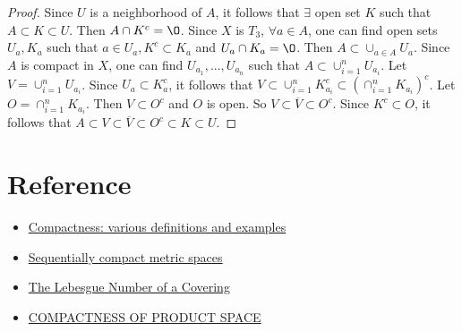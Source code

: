 \begin{proof}
    Since $U$ is a neighborhood of $A$, it follows that $\exists$ open set $K$ such that $A\subset K\subset U$. 
    Then $A\cap K^c=\O$. Since $X$ is $T_3$, $\forall a\in A$, 
    one can find open sets $U_a,K_a$ such that $a\in U_a, K^c\subset K_a$ and $U_a\cap K_a=\O$. 
    Then $A\subset \cup_{a\in A}U_a$. Since $A$ is compact in $X$, one can find $U_{a_1},...,U_{a_n}$ such that $A\subset \cup_{i=1}^{n} U_{a_i}$.
    Let $V=\cup_{i=1}^{n}U_{a_i}$. 
    Since $U_{a}\subset K_a^c$, it follows that $V\subset \cup_{i=1}^{n} K_{a_i}^c\subset (\cap_{i=1}^{n} K_{a_i})^c$.
    Let $O=\cap_{i=1}^{n} K_{a_i}$. Then $V\subset O^c$ and $O$ is open. So $V\subset \overline{V}\subset O^c$.
    Since $K^c\subset O$, it follows that $A\subset V\subset \overline{V}\subset O^c\subset K\subset U$.
\end{proof}



\section{Reference}

\begin{itemize}
    \item \href{http://staff.ustc.edu.cn/~wangzuoq/Courses/21S-Topology/Notes/Lec08.pdf}{Compactness: various definitions and examples}
    \item \href{https://people.clas.ufl.edu/mjury/files/sequential_compactness_notes.pdf}{Sequentially compact metric spaces}
    \item \href{https://www.umsl.edu/~siegelj/SetTheoryandTopology/Compact2.html}{The Lebesgue Number of a Covering}
    \item \href{http://staff.ustc.edu.cn/~wangzuoq/Courses/21S-Topology/Notes/Lec10.pdf}{COMPACTNESS OF PRODUCT SPACE}
\end{itemize}